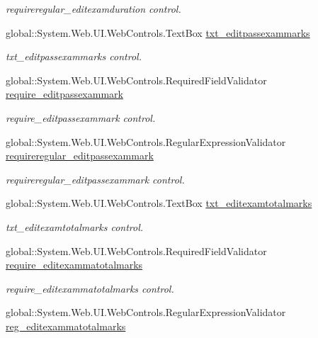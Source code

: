 \begin{DoxyCompactItemize}
\begin{DoxyCompactList}\small\item\em requireregular\+\_\+editexamduration control. \end{DoxyCompactList}\item 
global\+::\+System.\+Web.\+U\+I.\+Web\+Controls.\+Text\+Box \mbox{\hyperlink{classeditexam_a44a3c6f154ddd43edd9f9e9e610a611f}{txt\+\_\+editpassexammarks}}
\begin{DoxyCompactList}\small\item\em txt\+\_\+editpassexammarks control. \end{DoxyCompactList}\item 
global\+::\+System.\+Web.\+U\+I.\+Web\+Controls.\+Required\+Field\+Validator \mbox{\hyperlink{classeditexam_ad4140580caa8ce8b75fea4ffa93b5907}{require\+\_\+editpassexammark}}
\begin{DoxyCompactList}\small\item\em require\+\_\+editpassexammark control. \end{DoxyCompactList}\item 
global\+::\+System.\+Web.\+U\+I.\+Web\+Controls.\+Regular\+Expression\+Validator \mbox{\hyperlink{classeditexam_acfaeba15e3d7e1e4c4cf5b1668371030}{requireregular\+\_\+editpassexammark}}
\begin{DoxyCompactList}\small\item\em requireregular\+\_\+editpassexammark control. \end{DoxyCompactList}\item 
global\+::\+System.\+Web.\+U\+I.\+Web\+Controls.\+Text\+Box \mbox{\hyperlink{classeditexam_a6e3179c894b4f6e3d328f961ba3bf8f9}{txt\+\_\+editexamtotalmarks}}
\begin{DoxyCompactList}\small\item\em txt\+\_\+editexamtotalmarks control. \end{DoxyCompactList}\item 
global\+::\+System.\+Web.\+U\+I.\+Web\+Controls.\+Required\+Field\+Validator \mbox{\hyperlink{classeditexam_a1874b2a8ceabb8cb0e3975addf64c735}{require\+\_\+editexammatotalmarks}}
\begin{DoxyCompactList}\small\item\em require\+\_\+editexammatotalmarks control. \end{DoxyCompactList}\item 
global\+::\+System.\+Web.\+U\+I.\+Web\+Controls.\+Regular\+Expression\+Validator \mbox{\hyperlink{classeditexam_a7333ccbc95934394aa1c7e31f06aad0d}{reg\+\_\+editexammatotalmarks}}

\end{DoxyCompactItemize}
